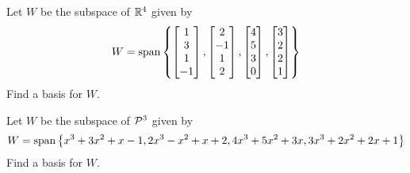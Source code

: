 \begin{activity}{10}
Let \(W\) be the subspace of \(\IR^4\) given by
 \[W = \vspan \left\{
 \begin{bmatrix} 1 \\ 3 \\ 1 \\ -1 \end{bmatrix},
 \begin{bmatrix} 2 \\ -1 \\ 1 \\ 2 \end{bmatrix},
 \begin{bmatrix} 4 \\ 5 \\ 3 \\ 0 \end{bmatrix},
 \begin{bmatrix} 3 \\ 2 \\ 2 \\ 1 \end{bmatrix}
 \right\} \]
 Find a basis for \(W\).
\end{activity}

\begin{activity}{10}
Let \(W\) be the subspace of \(\P^3\) given by
 \[W = \vspan \left\{x^3+3x^2+x-1, 2x^3-x^2+x+2, 4x^3+5x^2+3x, 3x^3+2x^2+2x+1 \right\} \]
 Find a basis for \(W\).
\end{activity}


